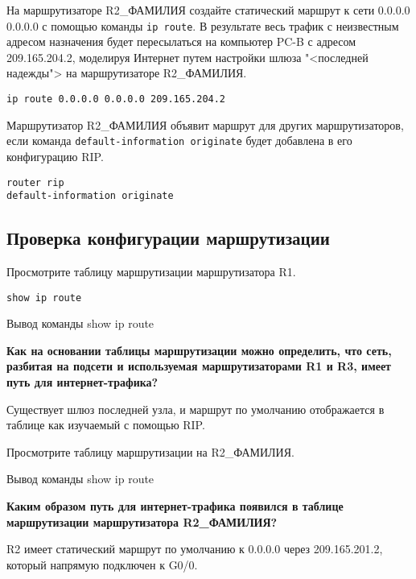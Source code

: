 На маршрутизаторе R2\_ФАМИЛИЯ создайте статический маршрут
к сети 0.0.0.0 0.0.0.0 с помощью команды \texttt{ip route}.
В результате весь трафик с неизвестным адресом назначения будет пересылаться
на компьютер PC-B с адресом 209.165.204.2,
моделируя Интернет путем настройки шлюза "<последней надежды">
на маршрутизаторе R2\_ФАМИЛИЯ.

\begin{verbatim}
ip route 0.0.0.0 0.0.0.0 209.165.204.2
\end{verbatim}

Маршрутизатор R2\_ФАМИЛИЯ объявит маршрут для других маршрутизаторов,
если команда \texttt{default-information originate} будет добавлена
в его конфигурацию RIP.

\begin{verbatim}
router rip
default-information originate
\end{verbatim}

\subsection{Проверка конфигурации маршрутизации}

Просмотрите таблицу маршрутизации маршрутизатора R1.

\begin{verbatim}
show ip route
\end{verbatim}

\begin{image}
	\caption{Вывод команды show ip route}
\end{image}

\textbf{Как на основании таблицы маршрутизации можно определить, что сеть,
разбитая на подсети и используемая маршрутизаторами R1 и R3,
имеет путь для интернет-трафика?}

Существует шлюз последней узла,
и маршрут по умолчанию отображается в таблице как изучаемый с помощью RIP.

Просмотрите таблицу маршрутизации на R2\_ФАМИЛИЯ.

\begin{image}
	\caption{Вывод команды show ip route}
\end{image}

\textbf{Каким образом путь для интернет-трафика появился
в таблице маршрутизации маршрутизатора R2\_ФАМИЛИЯ?}

R2 имеет статический маршрут по умолчанию к 0.0.0.0 через 209.165.201.2,
который напрямую подключен к G0/0.

